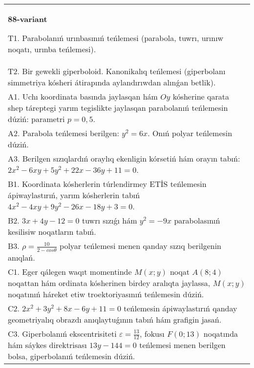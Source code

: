 \documentclass{article}
\begin{document}
\begin{tabular}{m{17cm}}
\textbf{88-variant}
\newline

T1. Parabolanıń urınbasınıń teńlemesi (parabola, tuwrı, urınıw noqatı, urınba teńlemesi).\\

T2. Bir gewekli giperboloid. Kanonikalıq teńlemesi (giperbolanı simmetriya kósheri átirapında aylandırıwdan alınǵan betlik).\\

A1. Uchı koordinata basında jaylasqan hám $Oy$ kósherine qarata shep táreptegi yarım tegislikte jaylasqan parabolanıń teńlemesin dúziń: parametri $p=0,5$.\\

A2. Parabola teńlemesi berilgen: $y^2=6 x$. Onıń polyar teńlemesin dúziń.\\

A3. Berilgen sızıqlardıń oraylıq ekenligin kórsetiń hám orayın tabıń: $2 x^{2}-6 xy+5 y^{2}+22 x-36 y+11=0$.\\

B1. Koordinata kósherlerin túrlendirmey ETİS teńlemesin ápiwaylastırıń, yarım kósherlerin tabıń $4x^{2} - 4xy + 9y^{2} - 26x - 18y + 3 = 0$.\\

B2. $3x + 4y - 12 = 0$ tuwrı sızıǵı hám $y^{2} = - 9x$ parabolasınıń kesilisiw noqatların tabıń.  \\

B3. $\rho = \frac{10}{2 - cos\theta}$ polyar teńlemesi menen qanday sızıq berilgenin anıqlań.  \\

C1. Eger qálegen waqıt momentinde $M(x;y)$ noqat $A(8;4)$ noqattan hám ordinata kósherinen birdey aralıqta jaylassa, $M(x;y)$ noqatınıń háreket etiw troektoriyasınıń teńlemesin dúziń.  \\

C2. $2x^{2} + 3y^{2} + 8x - 6y + 11 = 0$ teńlemesin ápiwaylastırıń qanday geometriyalıq obrazdı anıqlaytuǵının tabıń hám grafigin jasań.\\

C3. Giperbolanıń ekscentrisiteti $\varepsilon = \frac{13}{12}$, fokusı $F(0;13)$ noqatında hám sáykes direktrisası $13y - 144 = 0$ teńlemesi menen berilgen bolsa, giperbolanıń teńlemesin dúziń.  \\

\end{tabular}
\vspace{1cm}
\end{document}
